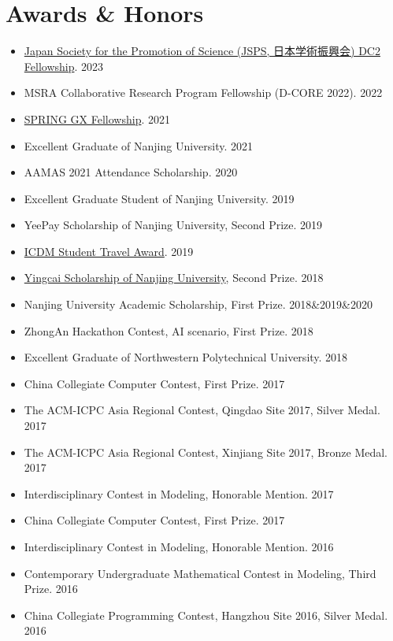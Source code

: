 \documentclass[UTF8]{ctexart}
\begin{document}
\section*{Awards \& Honors}
\begin{itemize}
    \item \href{https://www.jsps.go.jp/}{Japan Society for the Promotion of Science (JSPS, 日本学術振興会) DC2 Fellowship}. 2023
    \item MSRA Collaborative Research Program Fellowship (D-CORE 2022). 2022
    \item \href{https://spring-gx-appl.adm.s.u-tokyo.ac.jp/en/}{SPRING GX Fellowship}. 2021
    \item Excellent Graduate of Nanjing University. 2021
    \item AAMAS 2021 Attendance Scholarship. 2020
    \item Excellent Graduate Student of Nanjing University. 2019
    \item YeePay Scholarship of Nanjing University, Second Prize. 2019
    \item \href{http://icdm2019.bigke.org/}{ICDM Student Travel Award}. 2019
    \item \href{https://grawww.nju.edu.cn/9a/a6/c905a301734/page.psp}{Yingcai Scholarship of Nanjing University}, Second Prize. 2018
    \item Nanjing University Academic Scholarship, First Prize. 2018\&2019\&2020
    \item ZhongAn Hackathon Contest, AI scenario, First Prize. 2018
    \item Excellent Graduate of Northwestern Polytechnical University. 2018
    \item China Collegiate Computer Contest, First Prize. 2017
    \item The ACM-ICPC Asia Regional Contest, Qingdao Site 2017, Silver Medal. 2017
    \item The ACM-ICPC Asia Regional Contest, Xinjiang Site 2017, Bronze Medal. 2017
    \item Interdisciplinary Contest in Modeling, Honorable Mention. 2017
    \item China Collegiate Computer Contest, First Prize. 2017
    \item Interdisciplinary Contest in Modeling, Honorable Mention. 2016
    \item Contemporary Undergraduate Mathematical Contest in Modeling, Third Prize. 2016
    \item China Collegiate Programming Contest, Hangzhou Site 2016, Silver Medal. 2016

\end{itemize}
\end{document}
